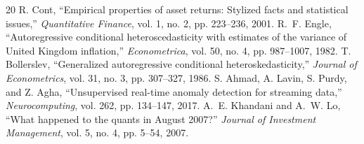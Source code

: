 \documentclass[10pt,twocolumn]{article}
\begin{document}
\begin{thebibliography}{20}
 R. Cont, ``Empirical properties of asset returns: Stylized facts and statistical issues,'' \emph{Quantitative Finance}, vol. 1, no. 2, pp. 223--236, 2001.
 R.~F. Engle, ``Autoregressive conditional heteroscedasticity with estimates of the variance of United Kingdom inflation,'' \emph{Econometrica}, vol. 50, no. 4, pp. 987--1007, 1982.
 T. Bollerslev, ``Generalized autoregressive conditional heteroskedasticity,'' \emph{Journal of Econometrics}, vol. 31, no. 3, pp. 307--327, 1986.
 S. Ahmad, A. Lavin, S. Purdy, and Z. Agha, ``Unsupervised real-time anomaly detection for streaming data,'' \emph{Neurocomputing}, vol. 262, pp. 134--147, 2017.
 A.~E. Khandani and A.~W. Lo, ``What happened to the quants in August 2007?'' \emph{Journal of Investment Management}, vol. 5, no. 4, pp. 5--54, 2007.
\end{thebibliography}
\end{document}
